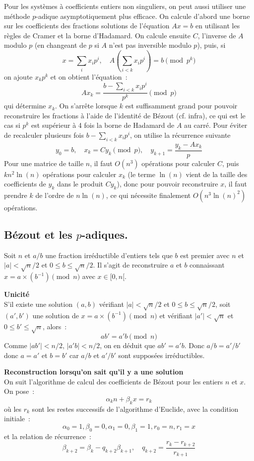 \documentclass[a4paper,11pt]{book}
\begin{document}
\begin{giacjshere}
Pour les syst\`emes \`a coefficients entiers non singuliers, 
on peut aussi utiliser une m\'ethode $p$-adique asymptotiquement
plus efficace. On calcule d'abord une borne sur les
coefficients des fractions solutions de l'\'equation $Ax=b$
en utilisant les règles de Cramer et la borne d'Hadamard.
On calcule ensuite $C$, l'inverse de $A$ modulo $p$ (en changeant de $p$ si
$A$ n'est pas inversible modulo $p$), puis, si
\[ x=\sum_i x_i p^i, \quad A(\sum_{i<k} x_i p^i)=b \pmod{p^k} \]
on ajoute $x_k p^k $ et on obtient l'\'equation~:
\[ Ax_k = \frac{b-\sum_{i <k}  x_i p^i}{p^k} \pmod p \]
qui d\'etermine $x_k$.
On s'arr\^ete lorsque $k$ est suffisamment grand pour pouvoir reconstruire
les fractions \`a l'aide de l'identité de B\'ezout (cf. infra),
ce qui est le cas si $p^k$ est
sup\'erieur \`a 4 fois la borne de Hadamard de $A$ au carr\'e.
Pour \'eviter de recalculer plusieurs fois $b-\sum_{i <k}  x_i p^i$,
on utilise la r\'ecurrence suivante
\[ y_0=b, \quad x_{k}=Cy_k \pmod p, \quad y_{k+1} =
\frac{y_k-Ax_{k}}{p}\]
Pour une matrice de taille $n$, il faut $O(n^3)$ op\'erations
pour calculer $C$, puis $kn^2 \ln(n)$ op\'erations 
pour calculer $x_k$ (le terme $\ln(n)$ 
vient de la taille des coefficients
de $y_k$ dans le produit $Cy_k$),
donc pour pouvoir reconstruire $x$, il faut prendre $k$ de l'ordre
de $n\ln(n)$, ce qui n\'ecessite finalement $O(n^3\ln(n)^2)$ op\'erations.

\subsection{B\'ezout et les $p$-adiques.}
Soit $n$ et $a/b$ une fraction irr\'eductible d'entiers tels que 
$b$ est premier avec $n$ et $|a| < \sqrt{n}/2$ et $ 0 \leq b \leq \sqrt{n}/2$.
Il s'agit de reconstruire $a$ et $b$ connaissant 
$x=a \times (b^{-1}) \pmod n$ avec $x\in [0,n[$.

{\bf Unicit\'e}\\
S'il existe une solution $(a,b)$ vérifiant $|a| < \sqrt{n}/2$ et 
$ 0 \leq b \leq \sqrt{n}/2$, soit $(a',b')$ une solution
de $x=a \times (b^{-1}) \pmod n$ et 
vérifiant $|a'| < \sqrt{n}$ et $ 0 \leq b' \leq \sqrt{n}$, alors~:
\[ a b'=a' b \pmod n \]
Comme $|ab'| < n/2$, $|a'b| <n/2$, 
on en d\'eduit que $ab'=a'b$. Donc $a/b=a'/b'$
donc $a=a'$ et $b=b'$ car $a/b$ et $a'/b'$ sont suppos\'ees irr\'eductibles.

{\bf Reconstruction lorsqu'on sait qu'il y a une solution}\\
On suit l'algorithme de calcul des coefficients de B\'ezout
pour les entiers $n$ et $x$. On pose~:
\[ \alpha_k n + \beta_k x= r_k \]
o\`u les $r_k$ sont les restes successifs de l'algorithme d'Euclide,
avec la condition initiale~:
\[ \alpha_0=1, \beta_0=0, \alpha_1=0, \beta_1=1, r_0=n, r_1=x \]
et la relation de r\'ecurrence~:
\[ \beta_{k+2}=\beta_k - q_{k+2} \beta_{k+1}, \quad
q_{k+2}=\frac{r_{k}-r_{k+2}}{r_{k+1}}\]


\end{giacjshere}
\end{document}
